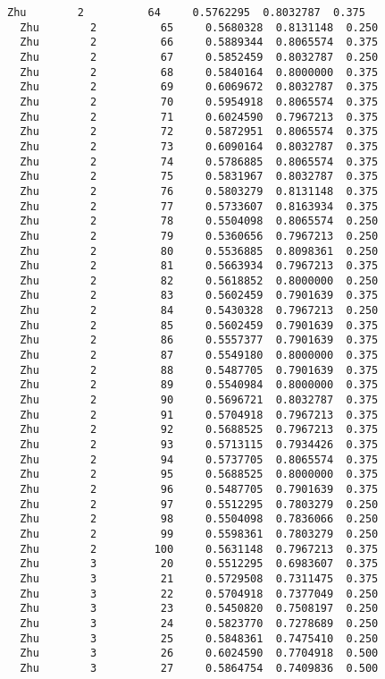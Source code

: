 \documentclass[11pt]{article}
\begin{document}
\begin{Verbatim}[commandchars=\\\{\}]
  Zhu        2          64     0.5762295  0.8032787  0.375
  Zhu        2          65     0.5680328  0.8131148  0.250
  Zhu        2          66     0.5889344  0.8065574  0.375
  Zhu        2          67     0.5852459  0.8032787  0.250
  Zhu        2          68     0.5840164  0.8000000  0.375
  Zhu        2          69     0.6069672  0.8032787  0.375
  Zhu        2          70     0.5954918  0.8065574  0.375
  Zhu        2          71     0.6024590  0.7967213  0.375
  Zhu        2          72     0.5872951  0.8065574  0.375
  Zhu        2          73     0.6090164  0.8032787  0.375
  Zhu        2          74     0.5786885  0.8065574  0.375
  Zhu        2          75     0.5831967  0.8032787  0.375
  Zhu        2          76     0.5803279  0.8131148  0.375
  Zhu        2          77     0.5733607  0.8163934  0.375
  Zhu        2          78     0.5504098  0.8065574  0.250
  Zhu        2          79     0.5360656  0.7967213  0.250
  Zhu        2          80     0.5536885  0.8098361  0.250
  Zhu        2          81     0.5663934  0.7967213  0.375
  Zhu        2          82     0.5618852  0.8000000  0.250
  Zhu        2          83     0.5602459  0.7901639  0.375
  Zhu        2          84     0.5430328  0.7967213  0.250
  Zhu        2          85     0.5602459  0.7901639  0.375
  Zhu        2          86     0.5557377  0.7901639  0.375
  Zhu        2          87     0.5549180  0.8000000  0.375
  Zhu        2          88     0.5487705  0.7901639  0.375
  Zhu        2          89     0.5540984  0.8000000  0.375
  Zhu        2          90     0.5696721  0.8032787  0.375
  Zhu        2          91     0.5704918  0.7967213  0.375
  Zhu        2          92     0.5688525  0.7967213  0.375
  Zhu        2          93     0.5713115  0.7934426  0.375
  Zhu        2          94     0.5737705  0.8065574  0.375
  Zhu        2          95     0.5688525  0.8000000  0.375
  Zhu        2          96     0.5487705  0.7901639  0.375
  Zhu        2          97     0.5512295  0.7803279  0.250
  Zhu        2          98     0.5504098  0.7836066  0.250
  Zhu        2          99     0.5598361  0.7803279  0.250
  Zhu        2         100     0.5631148  0.7967213  0.375
  Zhu        3          20     0.5512295  0.6983607  0.375
  Zhu        3          21     0.5729508  0.7311475  0.375
  Zhu        3          22     0.5704918  0.7377049  0.250
  Zhu        3          23     0.5450820  0.7508197  0.250
  Zhu        3          24     0.5823770  0.7278689  0.250
  Zhu        3          25     0.5848361  0.7475410  0.250
  Zhu        3          26     0.6024590  0.7704918  0.500
  Zhu        3          27     0.5864754  0.7409836  0.500

\end{Verbatim}
\end{document}
